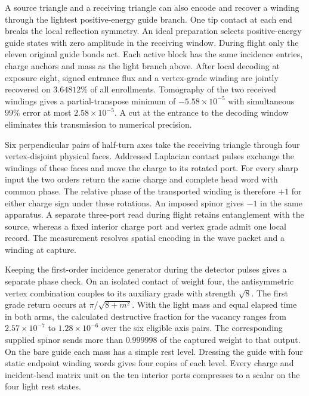 \documentclass[11pt]{article}
\theoremstyle{definition}
\theoremstyle{remark}
\theoremstyle{plain}
\begin{document}
A source triangle and a receiving triangle can also encode and recover
a winding through the lightest positive-energy guide branch. One tip
contact at each end breaks the local reflection symmetry. An ideal
preparation selects positive-energy guide states with zero amplitude
in the receiving window. During flight only the eleven original guide
bonds act. Each active block has the same incidence entries, charge
anchors and mass as the light branch above. After local decoding at
exposure eight, signed entrance flux and a vertex-grade winding are
jointly recovered on $3.64812\%$ of all enrollments. Tomography of the
two received windings gives a partial-transpose minimum of
$-5.58\times10^{-5}$ with simultaneous $99\%$ error at most
$2.58\times10^{-5}$. A cut at the entrance to the decoding window
eliminates this transmission to numerical precision.

Six perpendicular pairs of half-turn axes take the receiving triangle
through four vertex-disjoint physical faces. Addressed Laplacian contact pulses
exchange the windings of these faces and move the charge to its rotated
port. For every sharp input the two orders return the same charge and
complete head word with common phase. The relative phase of the
transported winding is therefore $+1$ for either charge sign under
these rotations. An imposed spinor gives $-1$ in the same apparatus.
A separate three-port read during flight retains entanglement with the
source, whereas a fixed interior charge port and vertex grade admit one
local record. The measurement resolves spatial encoding in the wave
packet and a winding at capture.

Keeping the first-order incidence generator during the detector pulses
gives a separate phase check. On an isolated contact of weight four,
the antisymmetric vertex combination couples to its auxiliary grade
with strength $\sqrt{8}$. The first grade return occurs at
$\pi/\sqrt{8+m^2}$. With the light mass and equal elapsed time in
both arms, the calculated destructive fraction for the vacancy ranges
from $2.57\times10^{-7}$ to $1.28\times10^{-6}$ over the six eligible
axis pairs. The corresponding supplied spinor sends more than
$0.999998$ of the captured weight to that output. On the bare guide
each mass has a simple rest level. Dressing the guide with four static
endpoint winding words gives four copies of each level. Every charge
and incident-head matrix unit on the ten interior ports compresses to
a scalar on the four light rest states.
\end{document}
